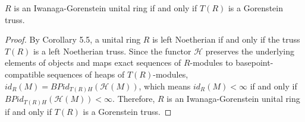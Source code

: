 \documentclass[11pt, twoside]{article}
\begin{document}
\begin{corollary}
$R$ is an Iwanaga-Gorenstein unital ring if and only if $T(R)$ is a Gorenstein truss.
\end{corollary}
\begin{proof}
By Corollary 5.5, a unital ring $R$ is left Noetherian if and only if the truss $T(R)$ is a left Noetherian truss. Since the functor $\mathcal{H}$ preserves the underlying elements of objects and maps exact sequences of $R$-modules to basepoint-compatible sequences of heaps of $T(R)$-modules, $id_{R}(M) = BPid_{T(R)H}(\mathcal{H}(M))$, which means $id_{R}(M) < \infty$ if and only if $BPid_{T(R)H}(\mathcal{H}(M)) < \infty$. Therefore, $R$ is an Iwanaga-Gorenstein unital ring if and only if $T(R)$ is a Gorenstein truss.
\end{proof}
\end{document}
